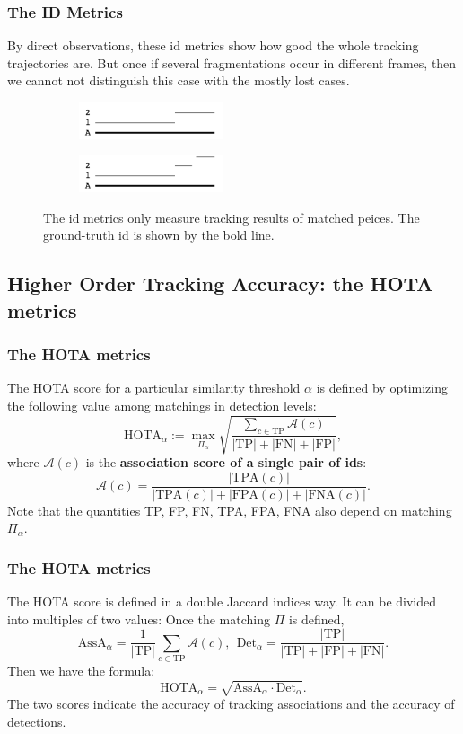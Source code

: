 \documentclass[slidetop, mathserif]{beamer}
\begin{document}
\begin{frame}
	\frametitle{The ID Metrics}
			
	By direct observations, these id metrics show how good the whole tracking trajectories are.
	But once if several fragmentations occur in different frames,
	then we cannot not distinguish this case with the mostly lost cases.
			
	\begin{figure}
		\begin{subfigure}{.5\textwidth}
			\centering
			\includegraphics[width=120pt]{pics/fig6.png}
		\end{subfigure}%
		\begin{subfigure}{.5\textwidth}
			\centering
			\includegraphics[width=120pt]{pics/fig7.png}
		\end{subfigure}
		\caption{The id metrics only measure tracking results of matched peices.
		The ground-truth id is shown by the bold line.}
	\end{figure}
			
\end{frame}

\subsection{Higher Order Tracking Accuracy: the HOTA metrics}

\begin{frame}
	\frametitle{The HOTA metrics}
		
	The HOTA score for a particular similarity threshold $\alpha$ is defined by
	optimizing the following value among matchings in detection levels:
	\[
		\text{HOTA}_\alpha := 
		\max_{\Pi_\alpha} \sqrt{\dfrac{\sum_{c\in\text{TP}} \mathcal A(c) }{|\text{TP}|+|\text{FN}|+|\text{FP}|}},
	\]
	where $\mathcal A(c)$ is the {\bf association score of a single pair of ids}:
	\[
		\mathcal A(c) = \dfrac{|\text{TPA}(c)|}{|\text{TPA}(c)|+|\text{FPA}(c)|+|\text{FNA}(c)|}.
	\]
	Note that the quantities TP, FP, FN, TPA, FPA, FNA also depend on matching $\Pi_\alpha$.
		
\end{frame}

\begin{frame}
	\frametitle{The HOTA metrics}
	The HOTA score is defined in a double Jaccard indices way.
	It can be divided into multiples of two values:
	Once the matching $\Pi$ is defined,
	\[
		\text{AssA}_\alpha = \dfrac{1}{|\text{TP}|} \sum_{c\in\text{TP}} \mathcal A(c), \ \ 
		\text{Det}_\alpha = \dfrac{|\text{TP}|}{|\text{TP}| + |\text{FP}| + |\text{FN}|}.
	\]
	Then we have the formula:
	\[
		\text{HOTA}_\alpha = \sqrt{\text{AssA}_\alpha \cdot \text{Det}_\alpha}.
	\]
	The two scores indicate the accuracy of tracking associations and the accuracy of detections.
\end{frame}
\end{document}
